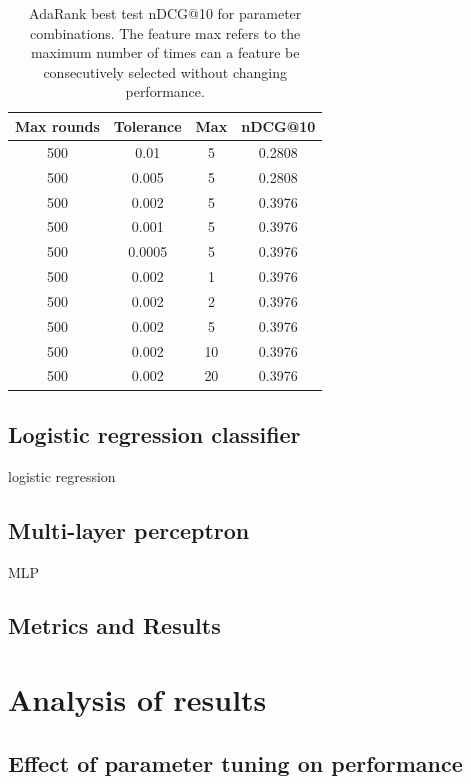 \documentclass[english]{article}
\theoremstyle{definition}
\begin{document}
\begin{multicols}{2}
\begin{table}[H]
\begin{center}
\begin{tabular}{c c c c}
  \hline
  Max rounds & Tolerance & Max & nDCG@10\\
  \hline
  500 & 0.01 & 5 & 0.2808 \\
  500 & 0.005 & 5 & 0.2808 \\
  500 & 0.002 & 5 & 0.3976 \\
  500 & 0.001 & 5 & 0.3976 \\
  500 & 0.0005 & 5 & 0.3976 \\
  \hline
  500 & 0.002 & 1 & 0.3976 \\
  500 & 0.002 & 2 & 0.3976 \\
  500 & 0.002 & 5 & 0.3976 \\
  500 & 0.002 & 10 & 0.3976 \\
  500 & 0.002 & 20 & 0.3976 \\
  \hline
\end{tabular}
\caption{\label{tab:AdaRank_train}AdaRank best test nDCG@10 for parameter combinations.  The feature max refers to the maximum number of times can a feature be consecutively selected without changing performance.}
\end{center}
\end{table}

\subsection{Logistic regression classifier}

logistic regression

\subsection{Multi-layer perceptron}

MLP

\subsection{Metrics and Results}

\section{Analysis of results}

\subsection{Effect of parameter tuning on performance}


\end{multicols}
\end{document}
